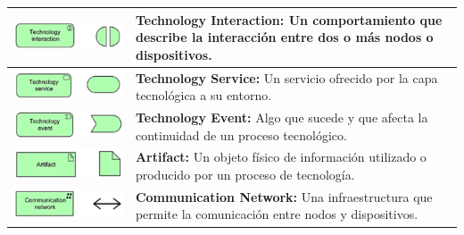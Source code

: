 \begin{longtable}{|c|p{8cm}|}
	\hline
	\includegraphics{anexos/ARCHI/technology/interaction.png}   &
	\textbf{Technology Interaction:} Un comportamiento que describe la interacción entre dos o más nodos o dispositivos.                          \\
	\hline
	\includegraphics{anexos/ARCHI/technology/service.png}       &
	\textbf{Technology Service:} Un servicio ofrecido por la capa tecnológica a su entorno.                                                       \\
	\hline
	\includegraphics{anexos/ARCHI/technology/event.png}         &
	\textbf{Technology Event:} Algo que sucede y que afecta la continuidad de un proceso tecnológico.                                             \\
	\hline
	\includegraphics{anexos/ARCHI/technology/artifact.png}      &
	\textbf{Artifact:} Un objeto físico de información utilizado o producido por un proceso de tecnología.                                        \\
	\hline
	\includegraphics{anexos/ARCHI/technology/network.png}       &
	\textbf{Communication Network:} Una infraestructura que permite la comunicación entre nodos y dispositivos.                                   \\

\end{longtable}
